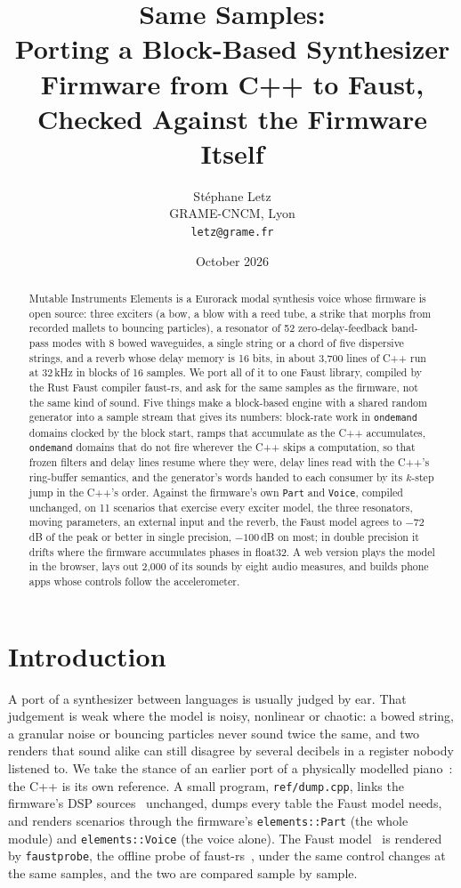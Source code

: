 \documentclass[10pt,a4paper,twocolumn]{article}
\title{Same Samples:\\Porting a Block-Based Synthesizer Firmware from C++ to Faust,\\Checked Against the Firmware Itself}
\author{St\'ephane Letz\\GRAME-CNCM, Lyon\\\texttt{letz@grame.fr}}
\date{October 2026}
\newcommand{\faustrs}{faust-rs}
\newcommand{\probe}{\texttt{faustprobe}}
\newcommand{\code}[1]{\texttt{#1}}
\begin{document}
\maketitle

\begin{abstract}
Mutable Instruments Elements is a Eurorack modal synthesis voice whose firmware is open source: three exciters (a bow, a blow with a reed tube, a strike that morphs from recorded mallets to bouncing particles), a resonator of 52 zero-delay-feedback band-pass modes with 8 bowed waveguides, a single string or a chord of five dispersive strings, and a reverb whose delay memory is 16 bits, in about 3,700 lines of C++ run at 32\,kHz in blocks of 16 samples. We port all of it to one Faust library, compiled by the Rust Faust compiler \faustrs{}, and ask for the same samples as the firmware, not the same kind of sound. Five things make a block-based engine with a shared random generator into a sample stream that gives its numbers: block-rate work in \code{ondemand} domains clocked by the block start, ramps that accumulate as the C++ accumulates, \code{ondemand} domains that do not fire wherever the C++ skips a computation, so that frozen filters and delay lines resume where they were, delay lines read with the C++'s ring-buffer semantics, and the generator's words handed to each consumer by its $k$-step jump in the C++'s order. Against the firmware's own \code{Part} and \code{Voice}, compiled unchanged, on 11 scenarios that exercise every exciter model, the three resonators, moving parameters, an external input and the reverb, the Faust model agrees to $-72$\,dB of the peak or better in single precision, $-100$\,dB on most; in double precision it drifts where the firmware accumulates phases in float32. A web version plays the model in the browser, lays out 2,000 of its sounds by eight audio measures, and builds phone apps whose controls follow the accelerometer.
\end{abstract}

\section{Introduction}

A port of a synthesizer between languages is usually judged by ear. That judgement is weak where the model is noisy, nonlinear or chaotic: a bowed string, a granular noise or bouncing particles never sound twice the same, and two renders that sound alike can still disagree by several decibels in a register nobody listened to. We take the stance of an earlier port of a physically modelled piano~\cite{coopiano}: the C++ is its own reference. A small program, \code{ref/dump.cpp}, links the firmware's DSP sources~\cite{elements} unchanged, dumps every table the Faust model needs, and renders scenarios through the firmware's \code{elements::Part} (the whole module) and \code{elements::Voice} (the voice alone). The Faust model~\cite{orlarey2009faust} is rendered by \probe{}, the offline probe of \faustrs{}~\cite{faustrs}, under the same control changes at the same samples, and the two are compared sample by sample.
\end{document}
